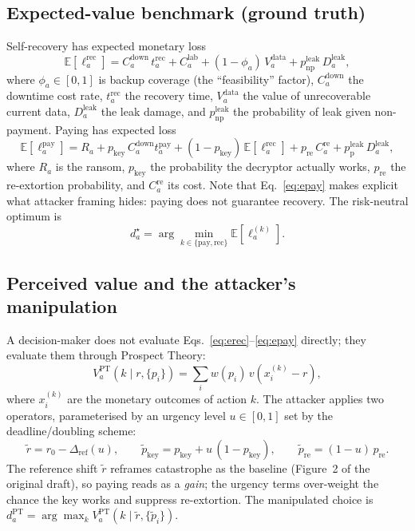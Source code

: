 \documentclass[jcp,article,submit,pdftex,moreauthors]{Definitions/mdpi}
\begin{document}
\subsection{Expected-value benchmark (ground truth)}
Self-recovery has expected monetary loss
\begin{equation}\label{eq:erec}
\mathbb{E}\!\left[\ell_a^{\mathrm{rec}}\right]=
C^{\mathrm{down}}_a\,t^{\mathrm{rec}}_a
+C^{\mathrm{lab}}_a
+(1-\phi_a)\,V^{\mathrm{data}}_a
+p^{\mathrm{leak}}_{\mathrm{np}}\,D^{\mathrm{leak}}_a,
\end{equation}
where $\phi_a\in[0,1]$ is backup coverage (the ``feasibility'' factor),
$C^{\mathrm{down}}_a$ the downtime cost rate, $t^{\mathrm{rec}}_a$ the recovery
time, $V^{\mathrm{data}}_a$ the value of unrecoverable current data,
$D^{\mathrm{leak}}_a$ the leak damage, and $p^{\mathrm{leak}}_{\mathrm{np}}$ the
probability of leak given non-payment. Paying has expected loss
\begin{equation}\label{eq:epay}
\mathbb{E}\!\left[\ell_a^{\mathrm{pay}}\right]=
R_a
+p_{\mathrm{key}}\,C^{\mathrm{down}}_a t^{\mathrm{pay}}_a
+(1-p_{\mathrm{key}})\,\mathbb{E}\!\left[\ell_a^{\mathrm{rec}}\right]
+p_{\mathrm{re}}\,C^{\mathrm{re}}_a
+p^{\mathrm{leak}}_{\mathrm{p}}\,D^{\mathrm{leak}}_a,
\end{equation}
where $R_a$ is the ransom, $p_{\mathrm{key}}$ the probability the decryptor
actually works, $p_{\mathrm{re}}$ the re-extortion probability, and
$C^{\mathrm{re}}_a$ its cost. Note that Eq.~\eqref{eq:epay} makes explicit what
attacker framing hides: paying does not guarantee recovery. The risk-neutral
optimum is
\begin{equation}\label{eq:opt}
d_a^{\star}=\arg\min_{k\in\{\mathrm{pay},\mathrm{rec}\}}\mathbb{E}\!\left[\ell_a^{(k)}\right].
\end{equation}

\subsection{Perceived value and the attacker's manipulation}
A decision-maker does not evaluate Eqs.~\eqref{eq:erec}--\eqref{eq:epay}
directly; they evaluate them through Prospect Theory:
\begin{equation}\label{eq:ptval}
V_a^{\mathrm{PT}}\!\left(k \mid r,\{p_i\}\right)=\sum_i w(p_i)\,v\!\left(x_i^{(k)}-r\right),
\end{equation}
where $x_i^{(k)}$ are the monetary outcomes of action $k$. The attacker applies
two operators, parameterised by an urgency level $u\in[0,1]$ set by the
deadline/doubling scheme:
\begin{equation}\label{eq:manip}
\tilde r = r_0-\Delta_{\mathrm{ref}}(u),\qquad
\tilde p_{\mathrm{key}} = p_{\mathrm{key}}+u\,(1-p_{\mathrm{key}}),\qquad
\tilde p_{\mathrm{re}} = (1-u)\,p_{\mathrm{re}}.
\end{equation}
The reference shift $\tilde r$ reframes catastrophe as the baseline (Figure~2 of
the original draft), so paying reads as a \emph{gain}; the urgency terms
over-weight the chance the key works and suppress re-extortion. The manipulated
choice is $d_a^{\mathrm{PT}}=\arg\max_k V_a^{\mathrm{PT}}(k \mid \tilde r,\{\tilde p_i\})$.
\end{document}
